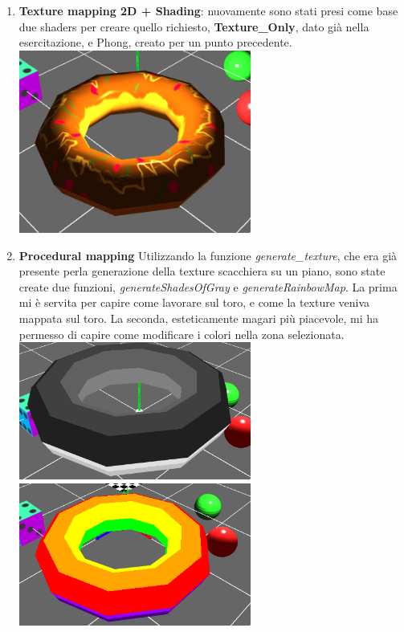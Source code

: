 \begin{enumerate}
    \item \textbf{Texture mapping 2D + Shading}: nuovamente sono stati presi come base due shaders per creare quello richiesto, \textbf{Texture\_Only}, dato già nella esercitazione, e Phong, creato per un punto precedente.  \\
           {\centering
\includegraphics[width=0.6\textwidth]{toroTexturePhong.png}} 
    \item \textbf{Procedural mapping} Utilizzando la funzione \textit{generate\_texture}, che era già presente perla generazione della texture scacchiera su un piano,
    sono state create due funzioni, \textit{generateShadesOfGray} e \textit{generateRainbowMap}. La prima mi è servita per capire come lavorare sul toro, e come la texture veniva mappata sul toro. La seconda, esteticamente magari più piacevole, mi ha permesso di capire come modificare i colori nella zona selezionata.\\
          {\centering
\includegraphics[width=0.6\textwidth]{toroGrey.png}}\\
{\centering
\includegraphics[width=0.6\textwidth]{toroArcobaleno.png}}

\end{enumerate}
